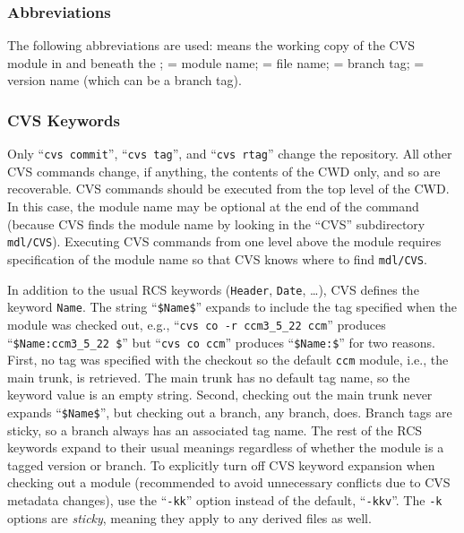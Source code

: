 \documentclass[12pt,twoside]{article}
\newcommand{\CVScolon}{:}
\begin{document}
\subsubsection{Abbreviations}
The following abbreviations are used:
 means the working copy of the CVS module in and beneath
the ;  = module name;
 = file name;  = branch tag; 
 = version name (which can be a branch tag).

\subsubsection{CVS Keywords}
Only ``\texttt{cvs commit}'', ``\texttt{cvs tag}'', and ``\texttt{cvs
rtag}'' change the repository. All other CVS commands change, if
anything, the contents of the CWD only, and so are recoverable. 
CVS commands should be executed from the top level of the CWD.
In this case, the module name  may be optional at the
end of the command (because CVS finds the module name by looking in
the ``CVS'' subdirectory \verb'mdl/CVS'). 
Executing CVS commands from one level above the module requires
specification of the module name so that CVS knows where to find
\verb'mdl/CVS'. 

In addition to the usual RCS keywords (\texttt{Header}, \texttt{Date},
\ldots), CVS defines the keyword \texttt{Name}.  
The string ``\texttt{\$Name\$}'' expands to include the tag specified 
when the module was checked out, e.g., ``\texttt{cvs co -r ccm3\_5\_22
ccm}'' produces ``\texttt{\$Name\CVScolon ccm3\_5\_22 \$}'' but
``\texttt{cvs co ccm}'' produces ``\texttt{\$Name\CVScolon \$}'' for
two reasons. 
First, no tag was specified with the checkout so the default
\verb'ccm' module, i.e., the main trunk, is retrieved.
The main trunk has no default tag name, so the keyword value is an
empty string. 
Second, checking out the main trunk never expands
``\texttt{\$Name\$}'', but checking out a branch, any branch, does.
Branch tags are sticky, so a branch always has an associated tag
name. 
The rest of the RCS keywords expand to their usual meanings regardless
of whether the module is a tagged version or branch.
To explicitly turn off CVS keyword expansion when checking out a
module (recommended to avoid unnecessary conflicts due to CVS metadata
changes), use  the ``\texttt{-kk}'' option instead of the default,
``\texttt{-kkv}''.   
The \verb'-k' options are \textit{sticky}, meaning they apply to any
derived files as well.
\end{document}
